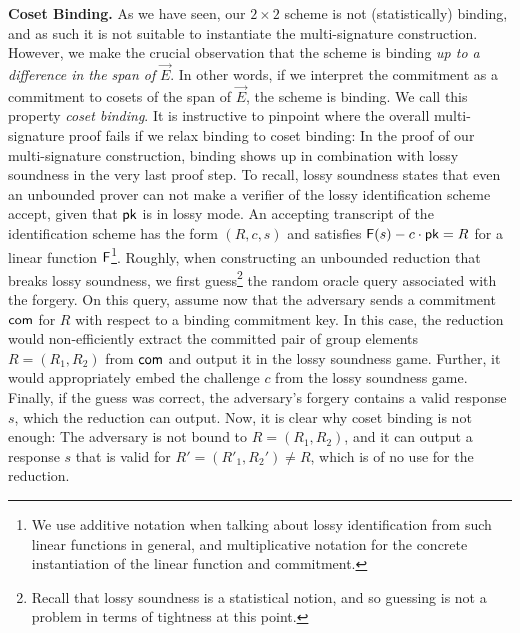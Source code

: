 \documentclass[version=final]{iacrcc}
\theoremstyle{mytheorem}				\newtheorem{theorem}{Theorem}
\theoremstyle{myplain}
\theoremstyle{mydefinition}
\theoremstyle{myremark}
\begin{document}
\smallskip\noindent\textbf{Coset Binding.}
As we have seen, our $2\times 2$ scheme is not (statistically) binding, and as such it is not suitable to instantiate the multi-signature construction.
However, we make the crucial observation that the scheme is binding \emph{up to a difference in the span of }$\vec{E}$.
In other words, if we interpret the commitment as a commitment to cosets of the span of $\vec{E}$, the scheme is binding. 
We call this property \emph{coset binding}.
It is instructive to pinpoint where the overall multi-signature proof fails if we relax binding to coset binding: 
In the proof of our multi-signature construction, binding shows up in combination with lossy soundness in the very last proof step.
To recall, lossy soundness states that even an unbounded prover can not make a verifier of the lossy identification scheme accept, given that ${\mathsf{pk}}$ is in lossy mode.
An accepting transcript of the identification scheme has the form $(R,c,s)$ and satisfies ${\mathsf{F}}(s) - c\cdot {\ensuremath{\mathsf{pk}}} = R$ for a linear function ${\mathsf{F}}$\footnote{We use additive notation when talking about lossy identification from such linear functions in general, and multiplicative notation for the concrete instantiation of the linear function and commitment.}.
Roughly, when constructing an unbounded reduction that breaks lossy soundness, we first guess\footnote{Recall that lossy soundness is a statistical notion, and so guessing is not a problem in terms of tightness at this point.} the random oracle query associated with the forgery.
On this query, assume now that the adversary sends a commitment $\mathsf{com}$ for $R$ with respect to a binding commitment key.
In this case, the reduction would non-efficiently extract the committed pair of group elements $R = (R_1,R_2)$ from $\mathsf{com}$ and output it in the lossy soundness game.
Further, it would appropriately embed the challenge $c$ from the lossy soundness game.
Finally, if the guess was correct, the adversary's forgery contains a valid response $s$, which the reduction can output.
Now, it is clear why coset binding is not enough: 
The adversary is not bound to $R=(R_1,R_2)$, and it can output a response $s$ that is valid for $R' = (R'_1,R_2') \neq R$, which is of no use for the reduction.
\end{document}
